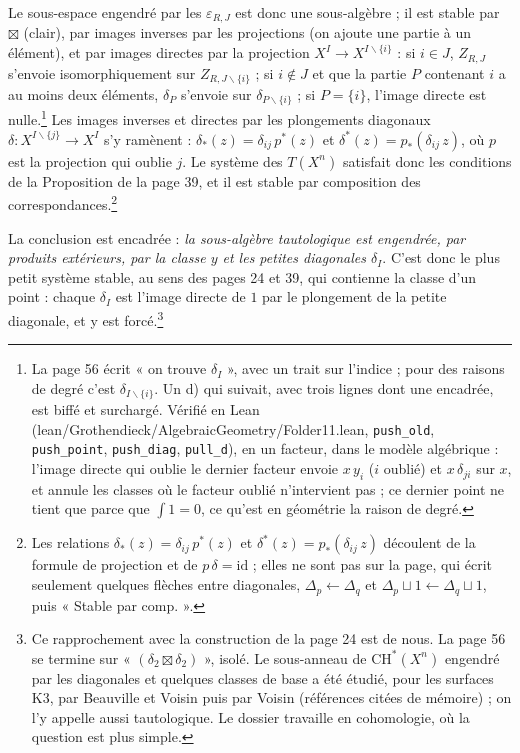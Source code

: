 \documentclass[11pt,a4paper]{article}
\begin{document}
Le sous-espace engendré par les $\varepsilon_{R,J}$ est donc une sous-algèbre ;
il est stable par $\boxtimes$ (clair), par images inverses par les projections
(on ajoute une partie à un élément), et par images directes par la projection
$X^{I} \to X^{I \smallsetminus \{i\}}$ : si $i \in J$, $Z_{R,J}$ s'envoie
isomorphiquement sur $Z_{R, J \smallsetminus \{i\}}$ ; si $i \notin J$ et que
la partie $P$ contenant $i$ a au moins deux éléments, $\delta_{P}$ s'envoie sur
$\delta_{P \smallsetminus \{i\}}$ ; si $P = \{i\}$, l'image directe est
nulle.\footnote{La page 56 écrit « on trouve $\delta_{I}$ », avec un trait sur
l'indice ; pour des raisons de degré c'est $\delta_{I \smallsetminus \{i\}}$.
Un d) qui suivait, avec trois lignes dont une encadrée, est biffé et
surchargé. Vérifié en Lean (lean/Grothendieck/AlgebraicGeometry/Folder11.lean,
\texttt{push\_old}, \texttt{push\_point}, \texttt{push\_diag},
\texttt{pull\_d}), en un facteur, dans le modèle algébrique : l'image directe
qui oublie le dernier facteur envoie $x\,y_{i}$ ($i$ oublié) et $x\,\delta_{ji}$
sur $x$, et annule les classes où le facteur oublié n'intervient pas ; ce
dernier point ne tient que parce que $\int 1 = 0$, ce qu'est en géométrie la
raison de degré.} Les images inverses et directes par les plongements diagonaux
$\delta \colon X^{I \smallsetminus \{j\}} \to X^{I}$ s'y ramènent :
$\delta_{*}(z) = \delta_{ij}\, p^{*}(z)$ et
$\delta^{*}(z) = p_{*}(\delta_{ij}\, z)$, où $p$ est la projection qui oublie
$j$. Le système des $T(X^{n})$ satisfait donc les conditions de la
Proposition de la page 39, et il est stable par composition des
correspondances.\footnote{Les relations $\delta_{*}(z) = \delta_{ij}\,p^{*}(z)$
et $\delta^{*}(z) = p_{*}(\delta_{ij}\,z)$ découlent de la formule de
projection et de $p\,\delta = \mathrm{id}$ ; elles ne sont pas sur la page, qui
écrit seulement quelques flèches entre diagonales, $\Delta_{p} \leftarrow
\Delta_{q}$ et $\Delta_{p} \sqcup 1 \leftarrow \Delta_{q} \sqcup 1$, puis
« Stable par comp. ».}

La conclusion est encadrée : \emph{la sous-algèbre tautologique est
engendrée, par produits extérieurs, par la classe $y$ et les petites
diagonales $\delta_{I}$}. C'est donc le plus petit système stable, au sens des
pages 24 et 39, qui contienne la classe d'un point : chaque $\delta_{I}$ est
l'image directe de $1$ par le plongement de la petite diagonale, et y est
forcé.\footnote{Ce rapprochement avec la construction de la page 24 est de
nous. La page 56 se termine sur « $(\delta_{2} \boxtimes \delta_{2})$ », isolé.
Le sous-anneau de $\mathrm{CH}^{*}(X^{n})$ engendré par les diagonales et
quelques classes de base a été étudié, pour les surfaces K3, par Beauville
et Voisin puis par Voisin (références citées de mémoire) ; on l'y appelle aussi
tautologique. Le dossier travaille en cohomologie, où la question est plus
simple.}
\end{document}
